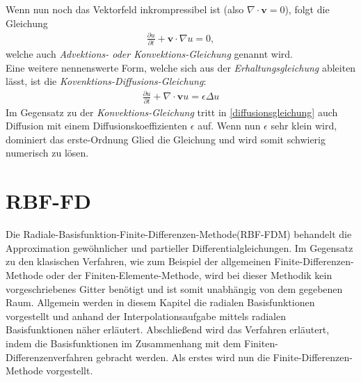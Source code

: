 \documentclass[a4paper,11pt]{article}
\begin{document}
Wenn nun noch das Vektorfeld inkrompressibel ist (also $\nabla \cdot \textbf{v}=0$), folgt die Gleichung
\begin{align}
 \frac{\partial u}{\partial t}+\textbf{v}\cdot\nabla u=0,
\end{align}
welche auch \textit{Advektions- oder Konvektions-Gleichung} genannt wird.\\
Eine weitere nennenswerte Form, welche sich aus der \textit{Erhaltungsgleichung} ableiten lässt, ist die \textit{Kovenktions-Diffusions-Gleichung}:
\begin{align}
 \frac{\partial u}{\partial t}+\nabla \cdot \textbf{v}u = \epsilon\Delta u\label{diffusionsgleichung}
\end{align}
Im Gegensatz zu der \textit{Konvektions-Gleichung} tritt in \eqref{diffusionsgleichung} auch Diffusion mit einem Diffusionskoeffizienten $\epsilon$ auf. Wenn nun $\epsilon$ sehr klein wird, dominiert das erste-Ordnung Glied die Gleichung und wird somit schwierig numerisch zu lösen.\cite{segal2013numerik}
\pagebreak
\section{RBF-FD}\label{sec:RBF-FD}
Die Radiale-Basisfunktion-Finite-Differenzen-Methode(RBF-FDM) behandelt die Approximation gewöhnlicher und partieller Differentialgleichungen. Im Gegensatz zu den klasischen Verfahren, wie zum Beispiel der allgemeinen Finite-Differenzen-Methode oder der Finiten-Elemente-Methode, wird bei dieser Methodik kein vorgeschriebenes Gitter benötigt und ist somit unabhängig von dem gegebenen Raum. Allgemein werden in diesem Kapitel die radialen Basisfunktionen vorgestellt und anhand der Interpolationsaufgabe mittels radialen Basisfunktionen näher erläutert. Abschließend wird das Verfahren erläutert, indem die Basisfunktionen im Zusammenhang mit dem Finiten-Differenzenverfahren gebracht werden. Als erstes wird nun die Finite-Differenzen-Methode vorgestellt.
\end{document}
